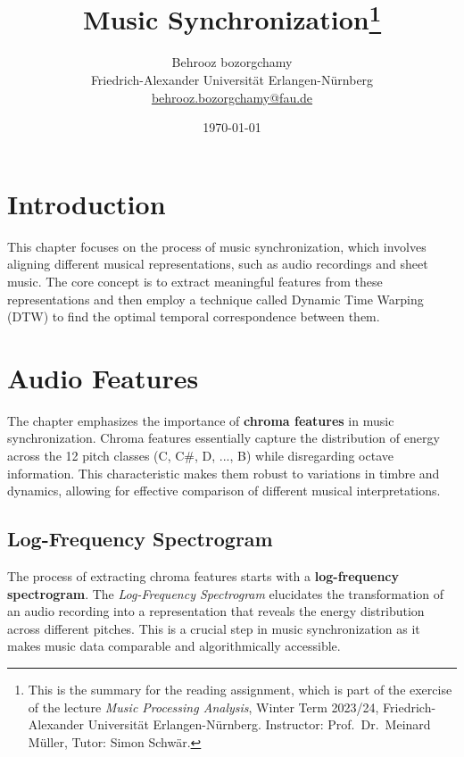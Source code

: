 \documentclass[a4paper, 9pt, twocolumn]{extarticle}
\begin{document}
\date{\normalsize \today}

\title{\vspace{-8mm}\textbf{\Large
Music Synchronization\footnote{This is the summary for the reading assignment,
which is part of the exercise of the lecture \emph{Music Processing Analysis}, Winter Term 2023/24,
Friedrich-Alexander Universit\"at Erlangen-N\"urnberg.
Instructor: Prof.\ Dr.\ Meinard M\"uller,
Tutor: Simon Schw\"ar.
}}}

\author{
{
\begin{minipage}{\textwidth}
\center
Behrooz bozorgchamy\\
\small
Friedrich-Alexander Universit\"at Erlangen-N\"urnberg
\protect\\{} %
\url{behrooz.bozorgchamy@fau.de}
\end{minipage}
}
}

\maketitle
\thispagestyle{empty}

\section{Introduction}
\label{section:introduction}

This chapter focuses on the process of music synchronization, which
involves aligning different musical representations, such as audio
recordings and sheet music. The core concept is to extract meaningful
features from these representations and then employ a technique called
Dynamic Time Warping (DTW) to find the optimal temporal correspondence
between them.
\section{Audio Features}
The chapter emphasizes the importance of \textbf{chroma features} in music
synchronization. Chroma features essentially capture the distribution of
energy across the 12 pitch classes (C, C\#, D, ..., B) while
disregarding octave information. This characteristic makes them robust
to variations in timbre and dynamics, allowing for effective comparison
of different musical interpretations.
\subsection{Log-Frequency Spectrogram}
The process of extracting chroma features starts with a
\textbf{log-frequency spectrogram}. The \emph{Log-Frequency Spectrogram}
elucidates the transformation of an audio recording into a
representation that reveals the energy distribution across different
pitches. This is a crucial step in music synchronization as it makes
music data comparable and algorithmically accessible.
\end{document}
